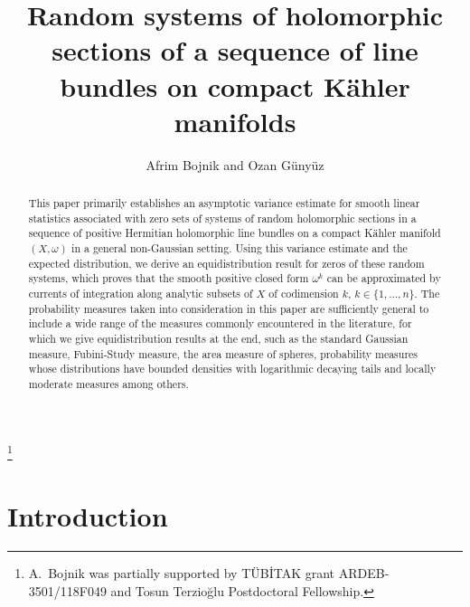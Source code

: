 \documentclass[11pt,leqno,oneside]{amsart}
\title[EQUIDISTRIBUTION]{Random systems of holomorphic sections of a sequence of line bundles on compact K\"{a}hler manifolds}
\numberwithin{equation}{section}
\begin{document}
\author{Afrim Bojnik and Ozan Günyüz}
\thanks{A.\ Bojnik was partially supported by T\"{U}B\.{I}TAK grant ARDEB-3501/118F049 and Tosun Terzioğlu Postdoctoral Fellowship.}

\begin{abstract}

This paper primarily establishes an asymptotic variance estimate for smooth linear statistics associated with zero sets of systems of random holomorphic sections in a sequence of positive Hermitian holomorphic line bundles on a compact Kähler manifold $(X, \omega)$ in a general non-Gaussian setting. Using this variance estimate and the expected distribution, we derive an equidistribution result for zeros of these random systems, which proves that the smooth positive closed form $\omega^{k}$ can be approximated by currents of integration along analytic subsets of $X$ of codimension $k$, $k \in \{1, \ldots, n\}$. The probability measures taken into consideration in this paper are sufficiently general to include a wide range of the measures commonly encountered in the literature, for which we give equidistribution results at the end, such as the standard Gaussian measure, Fubini-Study measure, the area measure of spheres, probability measures whose distributions have bounded densities with logarithmic decaying tails and locally moderate measures among others.




\end{abstract}
\maketitle



\section{Introduction}
\end{document}
